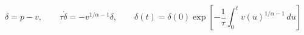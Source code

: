 \documentclass[12pt]{article}
\begin{document}
\fontsize{22}{28}\selectfont\[\delta=p-v,\qquad \tau\dot\delta=-v^{1/\alpha-1}\delta,\qquad \delta(t)=\delta(0)\exp\!\left[-\frac{1}{\tau}\int_0^t v(u)^{1/\alpha-1}\,du\right]\]
\end{document}
